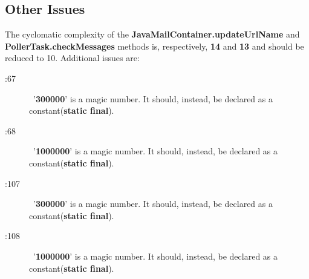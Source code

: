 \subsection{Other Issues}
The cyclomatic complexity of the \textbf{JavaMailContainer.updateUrlName} and \textbf{PollerTask.checkMessages} methods is, respectively, \textbf{14} and \textbf{13} and should be reduced to 10.
Additional issues are:
\begin{description}
	\item[:67]  '\textbf{300000}' is a magic number. It should, instead, be declared as a constant(\textbf{static final}).
	\item[:68]  '\textbf{1000000}' is a magic number. It should, instead, be declared as a constant(\textbf{static final}).
	\item[:107]  '\textbf{300000}' is a magic number. It should, instead, be declared as a constant(\textbf{static final}).
	\item[:108]  '\textbf{1000000}' is a magic number. It should, instead, be declared as a constant(\textbf{static final}).
\end{description}